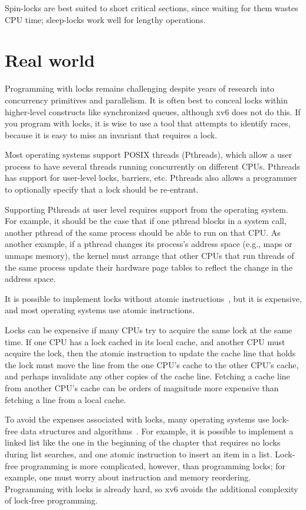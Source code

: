 Spin-locks are best suited to short critical sections,
since waiting for them wastes CPU time;
sleep-locks work well for lengthy operations.

\section{Real world}
Programming with locks remains challenging despite years of research
into concurrency primitives and parallelism.
It is often best to conceal locks within 
higher-level constructs like synchronized queues, although xv6 does not
do this.  If you program with locks, it is wise to use a tool that attempts to
identify races, because it is easy to miss an invariant that requires
a lock.

Most operating systems support POSIX threads (Pthreads), which allow a
user process to have several threads running concurrently on different
CPUs.  Pthreads has support for user-level locks, barriers, etc.
Pthreads also allows a programmer to optionally specify that a lock
should be re-entrant.

Supporting Pthreads at user level requires support from the operating
system. For example, it should be the case that if one pthread blocks
in a system call, another pthread of the same process should be able
to run on that CPU.  As another example, if a pthread changes its
process's address space (e.g., maps or unmaps memory), the kernel must
arrange that other CPUs that run threads of the same process update
their hardware page tables to reflect the change in the address space.

It is possible to implement locks without atomic
instructions~\cite{lamport:bakery}, but it is expensive, and most
operating systems use atomic instructions.

Locks can be expensive if many CPUs try to acquire the same lock
at the same time.  If one CPU has a lock
cached in its local cache, and another CPU must acquire the lock, then the
atomic instruction to update the cache line that holds the lock must move the line
from the one CPU's cache to the other CPU's cache, and perhaps
invalidate any other copies of the cache line.  Fetching a cache line from
another CPU's cache can be orders of magnitude more expensive than
fetching a line from a local cache.

To avoid the expenses associated with locks, many operating systems
use lock-free data structures and algorithms~\cite{herlihy:art,mckenney:rcuusage}.
For example, it is possible to implement a linked list like the one in
the beginning of the chapter that requires no locks during list
searches, and one atomic instruction to insert an item in a list.
Lock-free programming is more complicated, however, than programming
locks; for example, one must worry about instruction and memory
reordering.  Programming with locks is already hard, so xv6 avoids the
additional complexity of lock-free programming.

